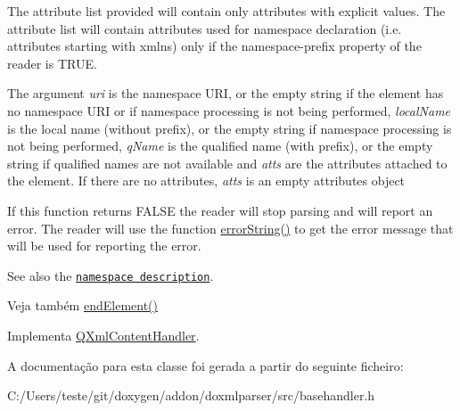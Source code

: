 The attribute list provided will contain only attributes with explicit values. The attribute list will contain attributes used for namespace declaration (i.\-e. attributes starting with xmlns) only if the namespace-\/prefix property of the reader is T\-R\-U\-E.

The argument {\itshape uri} is the namespace U\-R\-I, or the empty string if the element has no namespace U\-R\-I or if namespace processing is not being performed, {\itshape local\-Name} is the local name (without prefix), or the empty string if namespace processing is not being performed, {\itshape q\-Name} is the qualified name (with prefix), or the empty string if qualified names are not available and {\itshape atts} are the attributes attached to the element. If there are no attributes, {\itshape atts} is an empty attributes object

If this function returns F\-A\-L\-S\-E the reader will stop parsing and will report an error. The reader will use the function \hyperlink{class_q_xml_default_handler_af799a7684337babb971e2e0d8cda7cf1}{error\-String()} to get the error message that will be used for reporting the error.

See also the \href{xml-sax.html#namespaces}{\tt namespace description}.

\begin{DoxySeeAlso}{Veja também}
\hyperlink{class_base_handler_a05536b83184a79912d80d986a3d60bb5}{end\-Element()} 
\end{DoxySeeAlso}


Implementa \hyperlink{class_q_xml_content_handler_ac956b69e7f9be94f64e8e90095eb2ce0}{Q\-Xml\-Content\-Handler}.



A documentação para esta classe foi gerada a partir do seguinte ficheiro\-:\begin{DoxyCompactItemize}
\item 
C\-:/\-Users/teste/git/doxygen/addon/doxmlparser/src/basehandler.\-h\end{DoxyCompactItemize}
